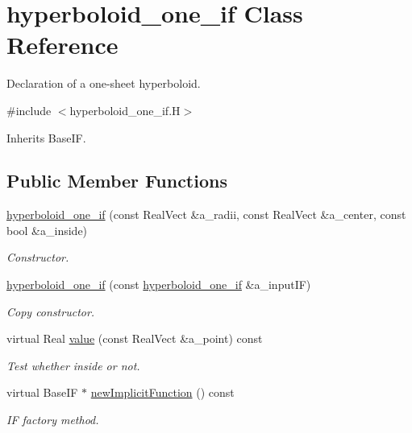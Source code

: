 \hypertarget{classhyperboloid__one__if}{}\section{hyperboloid\+\_\+one\+\_\+if Class Reference}
\label{classhyperboloid__one__if}


Declaration of a one-\/sheet hyperboloid.  




{\ttfamily \#include $<$hyperboloid\+\_\+one\+\_\+if.\+H$>$}



Inherits Base\+IF.

\subsection*{Public Member Functions}
\begin{DoxyCompactItemize}
\item 
\hyperlink{classhyperboloid__one__if_a76adc88dd1f2f3f61b73f083bc9445cc}{hyperboloid\+\_\+one\+\_\+if} (const Real\+Vect \&a\+\_\+radii, const Real\+Vect \&a\+\_\+center, const bool \&a\+\_\+inside)
\begin{DoxyCompactList}\small\item\em Constructor. \end{DoxyCompactList}\item 
\hyperlink{classhyperboloid__one__if_aff68c85b064162fbc231c6d543dc9a61}{hyperboloid\+\_\+one\+\_\+if} (const \hyperlink{classhyperboloid__one__if}{hyperboloid\+\_\+one\+\_\+if} \&a\+\_\+input\+IF)
\begin{DoxyCompactList}\small\item\em Copy constructor. \end{DoxyCompactList}\item 
virtual Real \hyperlink{classhyperboloid__one__if_ac1d4e195810461eae4019d9020910985}{value} (const Real\+Vect \&a\+\_\+point) const 
\begin{DoxyCompactList}\small\item\em Test whether inside or not. \end{DoxyCompactList}\item 
virtual Base\+IF $\ast$ \hyperlink{classhyperboloid__one__if_adffc9d812117d625c0400261f475e04a}{new\+Implicit\+Function} () const 
\begin{DoxyCompactList}\small\item\em IF factory method. \end{DoxyCompactList}\end{DoxyCompactItemize}

